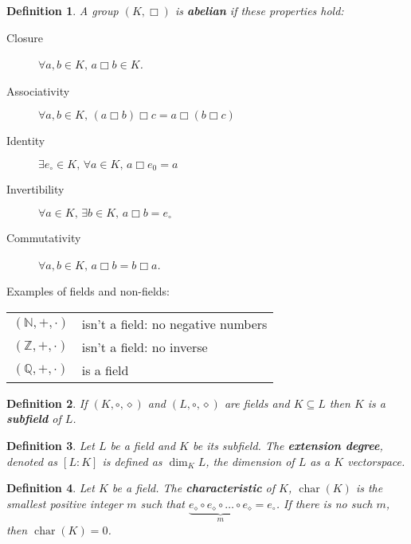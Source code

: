 \documentclass{article}
\newtheorem{definition}{Definition}
\newcommand{\ZZ}{\mathbb{Z}}
\newcommand{\NN}{\mathbb{N}}
\newcommand{\QQ}{\mathbb{Q}}
\begin{document}
\begin{definition}
    A group $(K, \Box)$ is \textbf{abelian} if these properties hold:

    \begin{description}
        \item[Closure] $\forall a, b \in K, \, a \Box b \in K$.
        \item[Associativity] $\forall a,b \in K, \, (a \Box b) \Box c = a \Box (b \Box c)$
        \item[Identity] $\exists e_\circ \in K, \, \forall a \in K, \,  a \Box e_0 = a$
        \item[Invertibility] $\forall a \in K, \, \exists b \in K, \, a \Box b = e_\circ$
        \item[Commutativity] $\forall a, b \in K, \, a \Box b = b \Box a$.
    \end{description}
\end{definition}

Examples of fields and non-fields:
\begin{tabular}{ll}
    $(\NN, +, \cdot)$ & isn't a field: no negative numbers \\
    $(\ZZ, +, \cdot)$ & isn't a field: no inverse          \\
    $(\QQ, +, \cdot)$ & is a field                         \\
\end{tabular}

\begin{definition}
    If $(K, \circ, \diamond)$ and $(L, \circ, \diamond)$ are fields and $K \subseteq L$
    then $K$ is a \textbf{subfield} of $L$.
\end{definition}

\begin{definition}
    Let $L$ be a field and $K$ be its subfield. The \textbf{extension degree}, denoted as $[L:K]$
    is defined as $\operatorname{dim}_K L$, the dimension of $L$ as a $K$ vectorspace.
\end{definition}

\begin{definition}\label{def:characteristic}
    Let $K$ be a field. The \textbf{characteristic} of $K$, $\operatorname{char}(K)$ is the
    smallest positive integer $m$ such that
    $\underbrace{e_\diamond \circ e_\diamond \circ \dots \circ e_\diamond}_{m} = e_\circ$.
    If there is no such $m$, then $\operatorname{char}(K) = 0$.
\end{definition}
\end{document}
